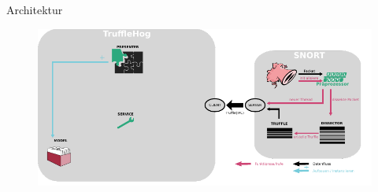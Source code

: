 \begin{frame}{Architektur}
    \begin{figure}
    	\centering
    	\includegraphics[width=\textwidth]{./images/arch/10.pdf}
    \end{figure}
\end{frame}
